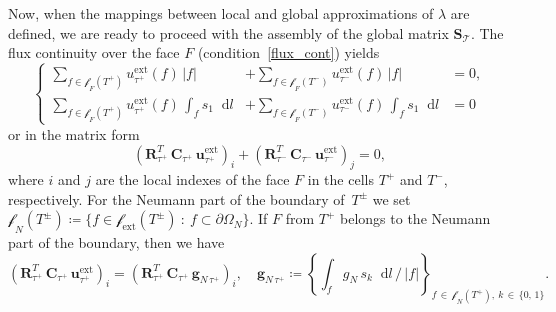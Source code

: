 \documentclass[12pt]{article}
\newcommand{\vect}[1]{\boldsymbol{\mathbf{#1}}}
\newcommand{\bcell}{T}
\newcommand{\bmesh}{{\vect{\mathcal T}}}
\newcommand{\mmesh}{{\vect{\mathcal \tau}}}
\newcommand{\mfaces}[1][]{{\vect{\mathcal f}_{\text{#1}}}}
\newcommand*\diff{\mathop{}\!\mathrm{d}}
\begin{document}
	Now, when the mappings between local and global approximations of $\lambda$ are defined, we are ready to proceed with the assembly of the global matrix $\vect S_\bmesh$. The flux continuity over the face $F$ \big(condition~\eqref{flux_cont}\big) yields
	\begin{equation*}
		\left\{\begin{split}
			\sum_{f\in \mfaces_F(T^+)} u^{\text{ext}}_{\mmesh^+}(f)\,|f| &+ \sum_{f\in \mfaces_F(T^-)} u^{\text{ext}}_{\mmesh^-}(f)\,|f| &= 0, \\
			\sum_{f\in \mfaces_F(T^+)} u^{\text{ext}}_{\mmesh^+}(f)\,\int_{f} s_1 \diff{l} &+ \sum_{f\in \mfaces_F(T^-)} u^{\text{ext}}_{\mmesh^-}(f)\,\int_{f} s_1 \diff{l} &= 0
		\end{split}\right.
	\end{equation*}
	or in the matrix form
	\begin{equation}\label{eq:aux1}
		\left( \vect R^T_{\mmesh^+}\,\vect C_{\mmesh^+}\,{\vect u}^{\text{ext}}_{\mmesh^+} \right)_i + \left( \vect R^T_{\mmesh^-}\,\vect C_{\mmesh^-}\,{\vect u}^{\text{ext}}_{\mmesh^-} \right)_j = 0,
	\end{equation}
	where $i$ and $j$ are the local indexes of the face $F$ in the cells $T^+$ and $T^-$, respectively. For the Neumann part of the boundary of~$\bcell^\pm$ we set $\mfaces_N(\bcell^\pm) \coloneqq \{ f \in \mfaces[ext](\bcell^\pm)\::\:f \subset \partial\Omega_N \}$. If $F$ from $T^+$ belongs to the Neumann part of the boundary, then we have
	\begin{equation*}
		\left( \vect R^T_{\mmesh^+}\,\vect C_{\mmesh^+}\,{\vect u}^{\text{ext}}_{\mmesh^+} \right)_i = \left( \vect R^T_{\mmesh^+}\,\vect C_{\mmesh^+}\,{\vect g}_{N\,\mmesh^+} \right)_i, \quad
		{\vect g}_{N\,\mmesh^+} \coloneqq \left\{ \int_f g_N\,s_k \diff{l}\,/\,|f| \right\}_{f\,\in\,\mfaces_N(\bcell^+),\:k\,\in\,\{0,\,1\}}.
	\end{equation*}
	
\end{document}
